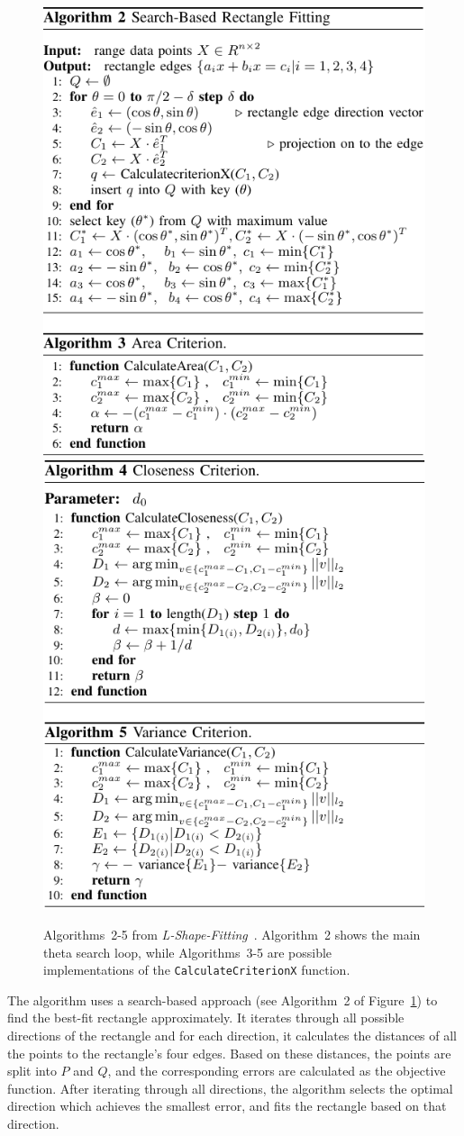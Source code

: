 \begin{figure}[htb]
    \includegraphics[width=0.49\linewidth]{figures/l_shape_fitting_fig_algs_1-cropped}
    \includegraphics[width=0.49\linewidth]{figures/l_shape_fitting_fig_algs_2-cropped}
    \caption{Algorithms~2-5 from \textit{L-Shape-Fitting}~\cite{zhang2017efficient}. Algorithm~2 shows the main theta search loop, while Algorithms~3-5 are possible implementations of the \texttt{CalculateCriterionX} function.}
    \label{fig:lsf-algs}
\end{figure}

The algorithm uses a search-based approach (see Algorithm~2 of Figure~\ref{fig:lsf-algs}) to find the best-fit rectangle approximately.
It iterates through all possible directions of the rectangle and for each direction, it calculates the distances of all the points to the rectangle's four edges.
Based on these distances, the points are split into $P$ and $Q$, and the corresponding errors are calculated as the objective function.
After iterating through all directions, the algorithm selects the optimal direction which achieves the smallest error, and fits the rectangle based on that direction.

